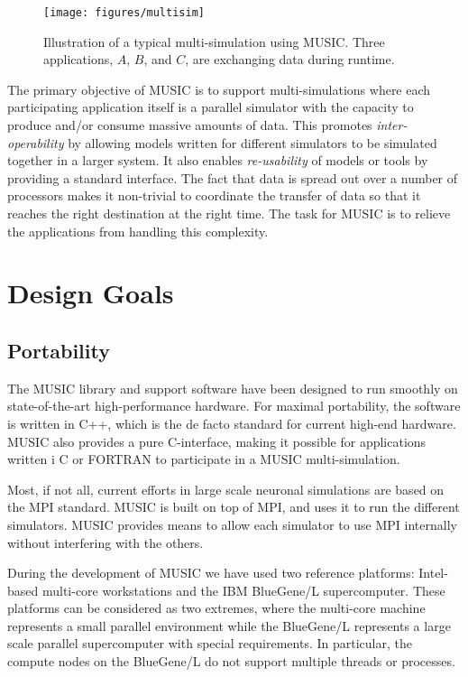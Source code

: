 \documentclass[a4paper]{report}
\begin{document}
\begin{figure}
  \begin{center}
    \texttt{[image: figures/multisim]}
    \caption[Typical multi-simulation]{\label{fig:multisim}
      Illustration of a typical multi-simulation using MUSIC.  Three
      applications, $A$, $B$, and $C$, are exchanging data during
      runtime.
    }
  \end{center}
\end{figure}

The primary objective of MUSIC is to support multi-simulations where
each participating application itself is a parallel simulator with the
capacity to produce and/or consume massive amounts of data.  This
promotes \emph{inter-operability} by allowing models written for
different simulators to be simulated together in a larger system.  It
also enables \emph{re-usability} of models or tools by providing a
standard interface.  The fact that data is spread out over a number of
processors makes it non-trivial to coordinate the transfer of data so
that it reaches the right destination at the right time.  The task for
MUSIC is to relieve the applications from handling this complexity.


\section{Design Goals}

\subsection{Portability}

The MUSIC library and support software have been designed to run
smoothly on state-of-the-art high-performance hardware.  For maximal
portability, the software is written in C++, which is the
de facto standard for current high-end hardware.  MUSIC also provides a
pure C-interface, making it possible for applications written i C or
FORTRAN to participate in a MUSIC multi-simulation.

Most, if not all, current efforts in large scale neuronal simulations
are based on the MPI standard.  MUSIC is built on top of
MPI, and uses it to run the different simulators.  MUSIC provides
means to allow each simulator to use MPI internally without
interfering with the others.

During the development of MUSIC we have used two reference platforms:
Intel-based multi-core workstations and the IBM
BlueGene/L supercomputer.  These
platforms can be considered as two extremes, where the multi-core
machine represents a small parallel environment while the BlueGene/L
represents a large scale parallel supercomputer with special
requirements.  In particular, the compute nodes on the BlueGene/L do
not support multiple threads or processes.
\end{document}
